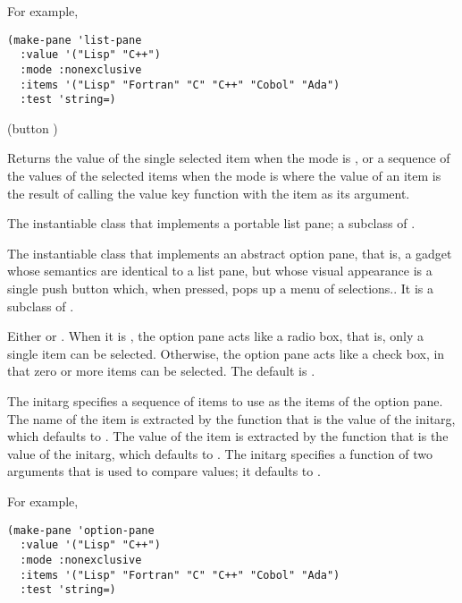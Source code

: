 For example,

\begin{verbatim}
(make-pane 'list-pane
  :value '("Lisp" "C++")
  :mode :nonexclusive
  :items '("Lisp" "Fortran" "C" "C++" "Cobol" "Ada")
  :test 'string=)
\end{verbatim}

 {(button )}

Returns the value of the single selected item when the mode is
, or a sequence of the values of the selected items
when the mode is  where the value of an item is the
result of calling the value key function with the item as its argument.


The instantiable class that implements a portable list pane; a subclass of
.


The instantiable class that implements an abstract option pane, that is, a
gadget whose semantics are identical to a list pane, but whose visual appearance
is a single push button which, when pressed, pops up a menu of selections..  It
is a subclass of .


Either  or .  When it is , the
option pane acts like a radio box, that is, only a single item can be selected.
Otherwise, the option pane acts like a check box, in that zero or more items can
be selected. The default is .


The  initarg specifies a sequence of items to use as the items of the
option pane.  The name of the item is extracted by the function that is the value
of the  initarg, which defaults to .  The
value of the item is extracted by the function that is the value of the
 initarg, which defaults to .  The 
initarg specifies a function of two arguments that is used to compare values; it
defaults to .

For example,

\begin{verbatim}
(make-pane 'option-pane
  :value '("Lisp" "C++")
  :mode :nonexclusive
  :items '("Lisp" "Fortran" "C" "C++" "Cobol" "Ada")
  :test 'string=)
\end{verbatim}

